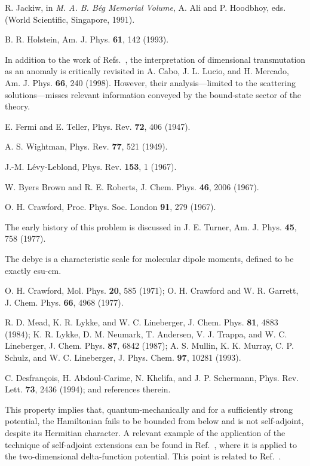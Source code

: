 \documentclass[a4paper,twocolumn,
showpacs,amssymb,aps,prl,superscriptaddress]{revtex4}%
\begin{document}
\begin{thebibliography}{99}
R. Jackiw,
in {\em M. A. B. B\'{e}g Memorial Volume\/},
A. Ali and P. Hoodbhoy, eds. (World Scientific, Singapore, 1991).

B. R. Holstein, Am. J. Phys. {\bf 61}, 142 (1993).

In addition to the work of Refs.~\cite{jac:91,hol:93}, the
interpretation of dimensional transmutation as an anomaly is
critically revisited in A. Cabo, J. L. Lucio, and H. Mercado, Am.
J. Phys. {\bf 66}, 240 (1998). However, their analysis---limited
to the scattering solutions---misses relevant information
conveyed by the bound-state sector of the theory.

E. Fermi and E. Teller,
Phys. Rev. {\bf 72}, 406 (1947).

A. S. Wightman,
Phys. Rev. {\bf 77}, 521 (1949).

J.-M. L\'{e}vy-Leblond,
Phys. Rev. {\bf 153}, 1 (1967).

W. Byers Brown and R. E. Roberts, J. Chem. Phys. {\bf 46}, 2006
(1967).

O. H. Crawford,
Proc. Phys. Soc. London {\bf 91},
279 (1967).

The early history of this problem is discussed in J. E. Turner,
Am. J. Phys. {\bf 45}, 758 (1977).

The debye \coordHE{} is a characteristic scale for  molecular dipole
moments, defined to be exactly  \coordHE{}  \coordHE{} esu-cm.

O. H. Crawford, Mol. Phys. {\bf 20}, 585 (1971); O. H. Crawford
and W. R. Garrett, J. Chem. Phys. {\bf 66}, 4968 (1977).

R. D. Mead, K. R. Lykke, and W. C. Lineberger, J. Chem. Phys.
{\bf 81}, 4883 (1984); K. R. Lykke, D. M. Neumark, T. Andersen, V.
J. Trappa, and W. C. Lineberger, J. Chem. Phys. {\bf 87}, 6842
(1987);
 A. S. Mullin, K. K. Murray, C. P. Schulz,
and W. C. Lineberger, J. Phys. Chem. {\bf 97}, 10281 (1993).

C. Desfran\c{c}ois, H. Abdoul-Carime, N. Khelifa, and J. P. Schermann,
Phys. Rev. Lett. {\bf 73}, 2436 (1994); and references therein.

This property implies that, quantum-mechanically and for a
sufficiently strong potential, the Hamiltonian fails to be bounded
from below and is not self-adjoint, despite its Hermitian
character. A relevant example of the application of the technique
of self-adjoint extensions can be found in Ref.~\cite{jac:91},
where it is applied to the two-dimensional delta-function
potential. This point is related to Ref.~\cite{est:86}.


\end{thebibliography}
\end{document}
